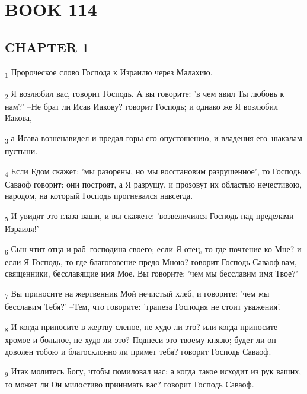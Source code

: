\section{BOOK 114}
\subsection{CHAPTER 1}
\begin{tcolorbox}
\textsubscript{1} Пророческое слово Господа к Израилю через Малахию.
\end{tcolorbox}
\begin{tcolorbox}
\textsubscript{2} Я возлюбил вас, говорит Господь. А вы говорите: 'в чем явил Ты любовь к нам?' --Не брат ли Исав Иакову? говорит Господь; и однако же Я возлюбил Иакова,
\end{tcolorbox}
\begin{tcolorbox}
\textsubscript{3} а Исава возненавидел и предал горы его опустошению, и владения его--шакалам пустыни.
\end{tcolorbox}
\begin{tcolorbox}
\textsubscript{4} Если Едом скажет: 'мы разорены, но мы восстановим разрушенное', то Господь Саваоф говорит: они построят, а Я разрушу, и прозовут их областью нечестивою, народом, на который Господь прогневался навсегда.
\end{tcolorbox}
\begin{tcolorbox}
\textsubscript{5} И увидят это глаза ваши, и вы скажете: 'возвеличился Господь над пределами Израиля!'
\end{tcolorbox}
\begin{tcolorbox}
\textsubscript{6} Сын чтит отца и раб--господина своего; если Я отец, то где почтение ко Мне? и если Я Господь, то где благоговение предо Мною? говорит Господь Саваоф вам, священники, бесславящие имя Мое. Вы говорите: 'чем мы бесславим имя Твое?'
\end{tcolorbox}
\begin{tcolorbox}
\textsubscript{7} Вы приносите на жертвенник Мой нечистый хлеб, и говорите: 'чем мы бесславим Тебя?' --Тем, что говорите: 'трапеза Господня не стоит уважения'.
\end{tcolorbox}
\begin{tcolorbox}
\textsubscript{8} И когда приносите в жертву слепое, не худо ли это? или когда приносите хромое и больное, не худо ли это? Поднеси это твоему князю; будет ли он доволен тобою и благосклонно ли примет тебя? говорит Господь Саваоф.
\end{tcolorbox}
\begin{tcolorbox}
\textsubscript{9} Итак молитесь Богу, чтобы помиловал нас; а когда такое исходит из рук ваших, то может ли Он милостиво принимать вас? говорит Господь Саваоф.
\end{tcolorbox}
